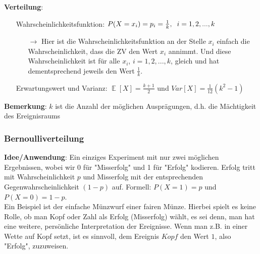 \documentclass[a4paper]{article}
\DeclareMathOperator*{\E}{\mathbb{E}}
\begin{document}
\noindent \textbf{Verteilung}: 
\begin{itemize}
\item[] Wahrscheinlichkeitsfunktion: $P(X=x_i)=p_i=\frac{1}{k}, \hspace{0.2cm} i=1,2,...,k$
	\begin{itemize}
	\item[$\rightarrow$] Hier ist die Wahrscheinlichkeitsfunktion an der Stelle $x_i$ einfach die Wahrscheinlichkeit, dass die ZV den Wert $x_i$ annimmt. Und diese Wahrscheinlichkeit ist für alle $x_i$, $i=1,2,...,k$, gleich und hat dementsprechend jeweils den Wert $\frac{1}{k}$.
	\end{itemize}
\item[] Erwartungswert und Varianz: $\E[X]=\frac{k+1}{2}$ und $Var[X]=\frac{1}{12}(k^2-1)$
\end{itemize}
\noindent \textbf{Bemerkung}: $k$ ist die Anzahl der möglichen Ausprägungen, d.h. die Mächtigkeit des Ereignisraums

\subsubsection{Bernoulliverteilung} \label{sec:Ber}

\noindent \textbf{Idee/Anwendung}:  Ein einziges Experiment mit nur zwei möglichen Ergebnissen, wobei wir 0 für "Misserfolg" und 1 für "Erfolg" kodieren. Erfolg tritt mit Wahrscheinlichkeit $p$ und Misserfolg mit der entsprechenden Gegenwahrscheinlichkeit $(1-p)$ auf. Formell: $P(X=1)=p$ und $P(X=0)=1-p$. \\

\noindent Ein Beispiel ist der einfache Münzwurf einer fairen Münze. Hierbei spielt es keine Rolle, ob man Kopf oder Zahl als Erfolg (Misserfolg) wählt, es sei denn, man hat eine weitere, persönliche Interpretation der Ereignisse. Wenn man z.B. in einer Wette auf Kopf setzt, ist es sinnvoll, dem Ereignis $Kopf$ den Wert $1$, also "Erfolg", zuzuweisen. \\
\end{document}
